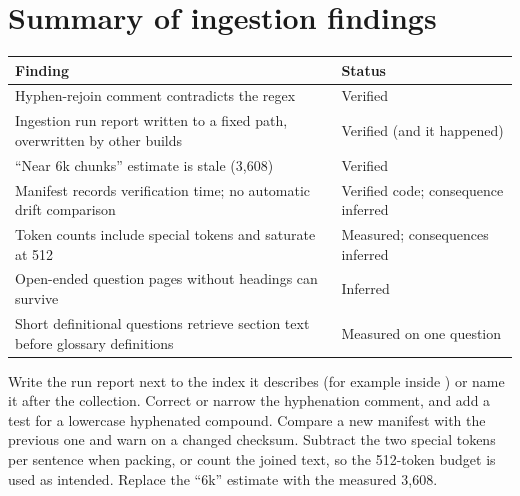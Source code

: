 \section{Summary of ingestion findings}

\begin{center}
\begin{tabularx}{\textwidth}{@{}>{\raggedright\arraybackslash}p{7.0cm}L@{}}
\toprule
\textbf{Finding} & \textbf{Status}\\
\midrule
Hyphen-rejoin comment contradicts the regex & Verified\\
Ingestion run report written to a fixed path, overwritten by other builds & Verified (and it happened)\\
\enquote{Near 6k chunks} estimate is stale (3,608) & Verified\\
Manifest  records verification time; no automatic drift comparison & Verified code; consequence inferred\\
Token counts include special tokens and saturate at 512 & Measured; consequences inferred\\
Open-ended question pages without headings can survive & Inferred\\
Short definitional questions retrieve section text before glossary definitions & Measured on one question\\
\bottomrule
\end{tabularx}
\end{center}

\begin{recommended}
Write the run report next to the index it describes (for example inside ) or name it after the collection. Correct or narrow the hyphenation comment, and add a test for a lowercase hyphenated compound. Compare a new manifest with the previous one and warn on a changed checksum. Subtract the two special tokens per sentence when packing, or count the joined text, so the 512-token budget is used as intended. Replace the \enquote{6k} estimate with the measured 3,608.
\end{recommended}
